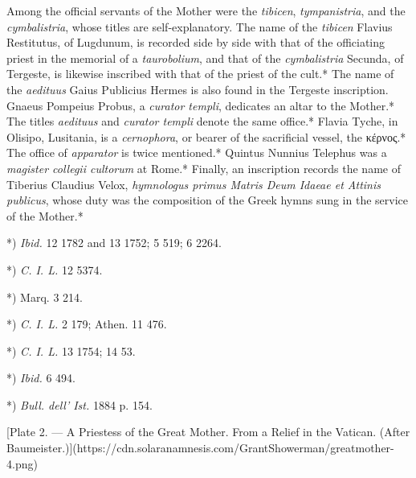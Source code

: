 \documentclass[a4paper, 11pt, oneside, polutonikogreek, english]{article}
\begin{document}
Among the official servants of the Mother were the \emph{tibicen}, \emph{tympanistria}, and the \emph{cymbalistria}, whose titles are self-explanatory. The name of the \emph{tibicen} Flavius Restitutus, of Lugdunum, is recorded side by side with that of the officiating priest in the memorial of a \emph{taurobolium}, and that of the \emph{cymbalistria} Secunda, of Tergeste, is likewise inscribed with that of the priest of the cult.* The name of the \emph{aedituus} Gaius Publicius Hermes is also found in the Tergeste inscription. Gnaeus Pompeius Probus, a \emph{curator templi}, dedicates an altar to the Mother.* The titles \emph{aedituus} and \emph{curator templi} denote the same office.* Flavia Tyche, in Olisipo, Lusitania, is a \emph{cernophora}, or bearer of the sacrificial vessel, the κέρνος.* The office of \emph{apparator} is twice mentioned.* Quintus Nunnius Telephus was a \emph{magister collegii cultorum} at Rome.* Finally, an inscription records the name of Tiberius Claudius Velox, \emph{hymnologus primus Matris Deum Idaeae et Attinis publicus}, whose duty was the composition of the Greek hymns sung in the service of the Mother.*

*) \emph{Ibid.} 12 1782 and 13 1752; 5 519; 6 2264.

*) \emph{C. I. L.} 12 5374.

*) Marq. 3 214.

*) \emph{C. I. L.} 2 179; Athen. 11 476.

*) \emph{C. I. L.} 13 1754; 14 53.

*) \emph{Ibid.} 6 494.

*) \emph{Bull. dell' Ist.} 1884 p. 154.

[Plate 2. --- A Priestess of the Great Mother. From a Relief in the Vatican. (After Baumeister.)](https://cdn.solaranamnesis.com/GrantShowerman/greatmother-4.png)
\end{document}
